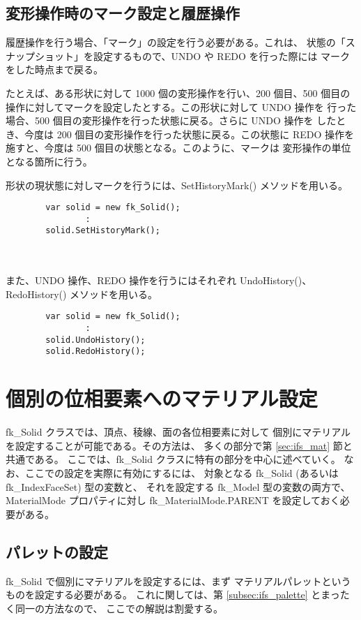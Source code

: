 \subsection{変形操作時のマーク設定と履歴操作}
履歴操作を行う場合、「マーク」の設定を行う必要がある。これは、
状態の「スナップショット」を設定するもので、UNDO や REDO を行った際には
マークをした時点まで戻る。

たとえば、ある形状に対して 1000 個の変形操作を行い、200 個目、500 個目の
操作に対してマークを設定したとする。この形状に対して UNDO 操作を
行った場合、500 個目の変形操作を行った状態に戻る。さらに UNDO 操作を
したとき、今度は 200 個目の変形操作を行った状態に戻る。この状態に
REDO 操作を施すと、今度は 500 個目の状態となる。このように、マークは
変形操作の単位となる箇所に行う。

形状の現状態に対しマークを行うには、SetHistoryMark() メソッドを用いる。\\
\begin{screen}
\begin{verbatim}
        var solid = new fk_Solid();
                :
        solid.SetHistoryMark();
\end{verbatim}
\end{screen} \\ ~ \\
また、UNDO 操作、REDO 操作を行うにはそれぞれ UndoHistory()、
RedoHistory() メソッドを用いる。\\
\begin{screen}
\begin{verbatim}
        var solid = new fk_Solid();
                :
        solid.UndoHistory();
        solid.RedoHistory();
\end{verbatim}
\end{screen}
\section{個別の位相要素へのマテリアル設定}
fk\_Solid クラスでは、頂点、稜線、面の各位相要素に対して
個別にマテリアルを設定することが可能である。その方法は、
多くの部分で第 \ref{sec:ifs_mat} 節と共通である。
ここでは、fk\_Solid クラスに特有の部分を中心に述べていく。
なお、ここでの設定を実際に有効にするには、
対象となる fk\_Solid (あるいは fk\_IndexFaceSet) 型の変数と、
それを設定する fk\_Model 型の変数の両方で、
MaterialMode プロパティに対し fk\_MaterialMode.PARENT を設定しておく必要がある。

\subsection{パレットの設定} \label{subsec:solid_palette}
fk\_Solid で個別にマテリアルを設定するには、まず
マテリアルパレットというものを設定する必要がある。
これに関しては、第 \ref{subsec:ifs_palette} とまったく同一の方法なので、
ここでの解説は割愛する。

